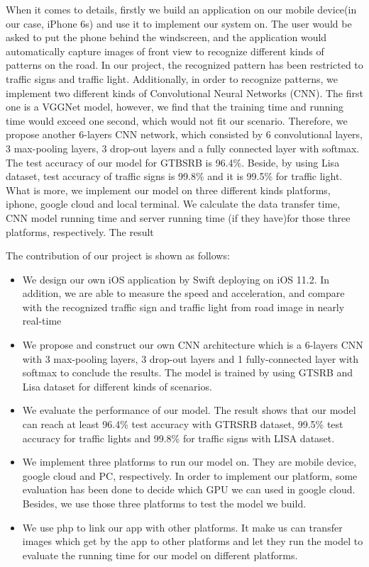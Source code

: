 \documentclass[conference]{IEEEtran}
\begin{document}
When it comes to details, firstly we build an application on our mobile device(in our case, iPhone 6s) and use it to implement our system on. The user would be asked to put the phone behind the windscreen, and the application would automatically capture images of front view to recognize different kinds of patterns on the road. In our project, the recognized pattern has been restricted to traffic signs and traffic light. Additionally, in order to recognize patterns, we implement two different kinds of Convolutional Neural Networks (CNN). The first one is a VGGNet model, however, we find that the training time and running time would exceed one second, which would not fit our scenario. Therefore, we propose another 6-layers CNN network, which consisted by 6 convolutional layers, 3 max-pooling layers, 3 drop-out layers and a fully connected layer with softmax. The test accuracy of our model for GTBSRB is 96.4\%.  Beside, by using Lisa dataset, test accuracy of traffic signs is 99.8\% and it is 99.5\% for traffic light. What is more, we implement our model on three different kinds platforms, iphone, google cloud and local terminal. We calculate the data transfer time, CNN model running time and server running time (if they have)for those three platforms, respectively. The result


The contribution of our project is shown as follows: 

\begin{itemize}
  \item We design our own iOS application by Swift deploying on iOS 11.2. In addition, we are able to measure the speed and acceleration, and compare with the recognized traffic sign and traffic light from road image in nearly real-time 
  \item We propose and construct our own CNN architecture which is a 6-layers CNN with 3 max-pooling layers, 3 drop-out layers and 1 fully-connected layer with softmax to conclude the results. The model is trained by using GTSRB and Lisa dataset for different kinds of scenarios.
  \item We evaluate the performance of our model. The result shows that our model can reach at least 96.4\% test accuracy with GTRSRB dataset, 99.5\% test accuracy for traffic lights and 99.8\% for traffic signs with LISA dataset.
  \item We implement three platforms to run our model on. They are mobile device, google cloud and PC, respectively. In order to implement our platform, some evaluation has been done to decide which GPU we can used in google cloud. Besides, we use those three platforms to test the model we build.
  \item  We use php to link our app with other platforms. It make us can transfer images which get by the app to other platforms and let they run the model to evaluate the running time for our model on different platforms.
\end{itemize}
\end{document}

